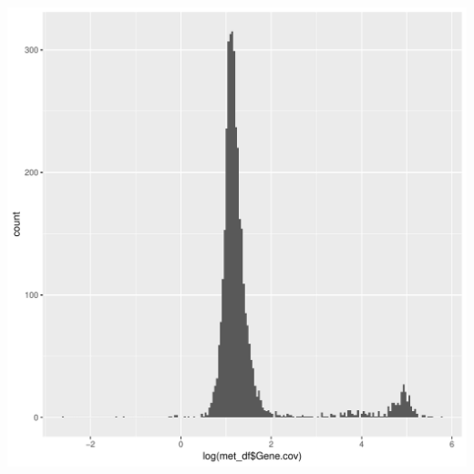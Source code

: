 \documentclass{article}\usepackage[]{graphicx}\usepackage[]{color}
\newenvironment{knitrout}{}{} %
\begin{document}
\begin{knitrout}
\color{fgcolor}

{\centering \includegraphics[width=1\linewidth]{figure/minimal-met_histo-1} 

}



\end{knitrout}
\clearpage
\end{document}
